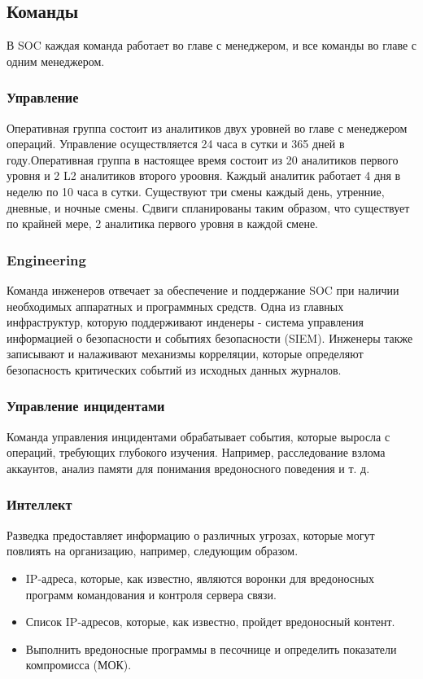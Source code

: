 \documentclass[12pt,]{article}
\begin{document}
\subsection{Команды}
В SOC каждая команда работает во главе с менеджером, и все команды во главе с одним менеджером.
\subsubsection{Управление}
Оперативная группа состоит из  аналитиков двух уровней во главе с менеджером операций. Управление осуществляется 24 часа в сутки и 365 дней в году.Оперативная группа в настоящее время состоит из
20 аналитиков первого уровня и 2 L2 аналитиков второго уроовня.  Каждый аналитик работает 4 дня в неделю по 10 часа в сутки. Существуют три смены каждый день, утренние, дневные, и ночные смены. Сдвиги спланированы таким образом, что существует по крайней мере, 2 аналитика первого уровня в каждой смене.
\subsubsection{Engineering}
Команда инженеров отвечает за обеспечение и поддержание SOC при наличии необходимых аппаратных и программных средств. Одна из главных инфраструктур, которую поддерживают инденеры - система управления информацией о безопасности и событиях безопасности (SIEM). Инженеры также записывают и налаживают механизмы корреляции, которые определяют безопасность критических событий из исходных данных журналов.
\subsubsection{Управление инцидентами}
Команда управления инцидентами обрабатывает события, которые выросла с операций, требующих глубокого изучения. Например, расследование взлома аккаунтов, анализ памяти для понимания вредоносного поведения и т. д.
\subsubsection{Интеллект}
Разведка предоставляет информацию о различных угрозах, которые могут повлиять на организацию, например, следующим образом.
\begin{itemize}
\item IP-адреса, которые, как известно, являются воронки для вредоносных программ  командования и контроля сервера связи.
\item Список IP-адресов, которые, как известно, пройдет вредоносный контент.
\item Выполнить вредоносные программы в песочнице и определить показатели компромисса (МОК).
\end{itemize}
\end{document}
